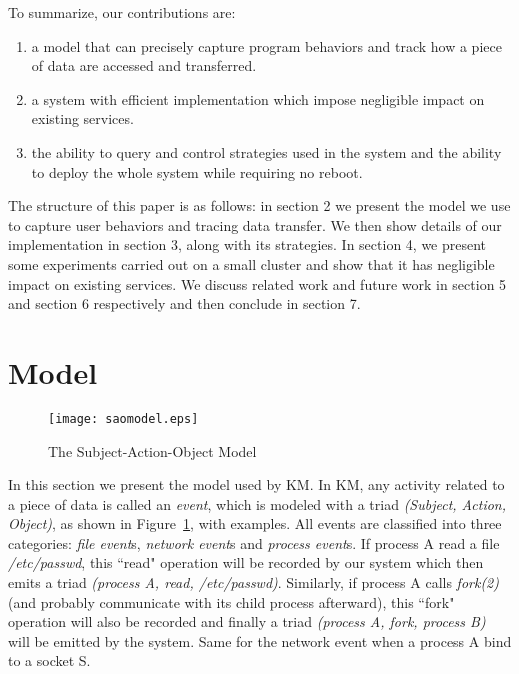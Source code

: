 \documentclass[letterpaper,twocolumn,10pt]{article}
\begin{document}
To summarize, our contributions are:
\begin{enumerate}
    \item a model that can precisely capture program behaviors and track how
        a piece of data are accessed and transferred.
    \item a system with efficient implementation which impose negligible
        impact on existing services.
    \item the ability to query and control strategies used in the system and
        the ability to deploy the whole system while requiring no reboot.
\end{enumerate}

The structure of this paper is as follows: in section 2 we present the model
we use to capture user behaviors and tracing data transfer. We then show
details of our implementation in section 3, along with its strategies. In
section 4, we present some experiments carried out on a small cluster and
show that it has negligible impact on existing services. We discuss related
work and future work in section 5 and section 6 respectively and then
conclude in section 7.

\section{Model} \label{sec:themodel}

\begin{figure}[t]
    \centering
    \texttt{[image: saomodel.eps]}
    \caption{The Subject-Action-Object Model}
    \label{fig:saomodel}
\end{figure}

In this section we present the model used by KM. In KM, any activity related
to a piece of data is called an \textit{event}, which is modeled with a triad
\textit{(Subject, Action, Object)}, as shown in Figure~\ref{fig:saomodel},
with examples. All events are classified into three categories: \textit{file
event}s, \textit{network event}s and \textit{process event}s. If process A
read a file \textit{/etc/passwd}, this ``read" operation will be recorded by
our system which then emits a triad \textit{(process A, read, /etc/passwd)}.
Similarly, if process A calls \textit{fork(2)} (and probably communicate with
its child process afterward), this ``fork" operation will also be recorded
and finally a triad \textit{(process A, fork, process B)} will be emitted by
the system. Same for the network event when a process A bind to a socket S. 
\end{document}
